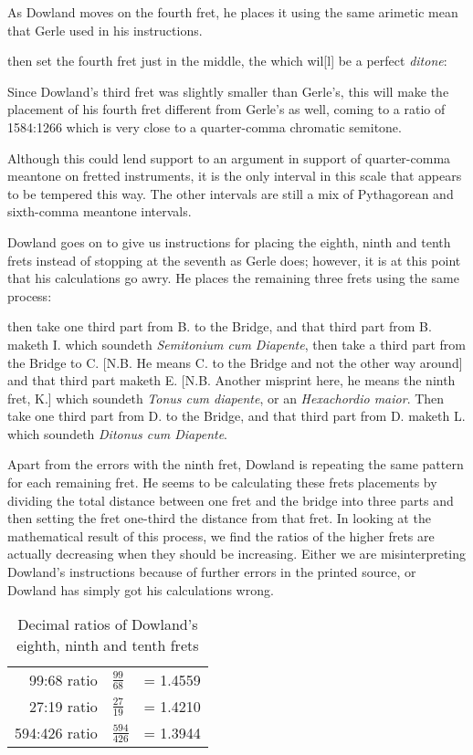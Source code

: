 As Dowland moves on the fourth fret, he places it using the same arimetic
mean that Gerle used in his instructions.
\begin{blocks}
then set the fourth fret just in the middle, the which wil[l] be a perfect
\emph{ditone}:
\end{blocks}
Since Dowland's third fret was slightly smaller than Gerle's, this will make
the placement of his fourth fret different from Gerle's as well, coming to
a ratio of 1584:1266 which is very close to a quarter-comma chromatic
semitone.

Although this could lend support to an argument in support of quarter-comma meantone
on fretted instruments, it is the only interval in
this scale that appears to be tempered this way.  The other intervals are still
a mix of Pythagorean and sixth-comma meantone intervals.

Dowland goes on to give us instructions for placing the eighth, ninth and tenth
frets instead of stopping at the seventh as Gerle does; however, it is at this
point that his calculations go awry.  He places the remaining
three frets using the same process:
\begin{blocks}
then take one third part from B. to the Bridge, and that third part from B.
maketh I. which soundeth \emph{Semitonium cum Diapente}, then take a third part
from the Bridge to C. [N.B. He means C. to the Bridge and not the other way
around] and that third part maketh E. [N.B. Another misprint here, he means the
ninth fret, K.] which soundeth \emph{Tonus cum diapente}, or an
\emph{Hexachordio maior}.  Then take one third part from D. to the Bridge, and
that third part from D. maketh L.  which soundeth \emph{Ditonus cum Diapente}.
\end{blocks}
Apart from the errors with the ninth fret, Dowland is repeating the same pattern
for each remaining fret.  He seems to be calculating these frets placements by
dividing the total distance between one fret and the bridge into three parts and
then setting the fret one-third the distance from that fret.  In looking at the
mathematical result of this process, we find the ratios of the higher frets
are actually decreasing when they should be increasing.  Either we are misinterpreting Dowland's
instructions because of further errors in the printed source, or Dowland has
simply got his calculations wrong.

\begin{table}[h!]
    \begin{center}
    \begin{tabular}{ r l l }
        99:68 ratio   & $ \frac{99}{68}   $ &  = 1.4559 \\
        27:19 ratio   & $ \frac{27}{19}   $ &  = 1.4210 \\
        594:426 ratio & $ \frac{594}{426} $ &  = 1.3944 \\
    \end{tabular}
    \end{center}
    \caption{Decimal ratios of Dowland's eighth, ninth and tenth frets}
\end{table}

